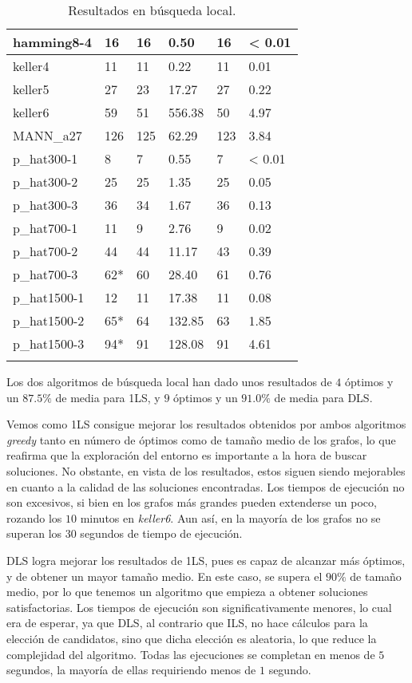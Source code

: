 \begin{small}
\begin{longtable}{l l l l l l}
    hamming8-4         & 16 & 16 & 0.50 & 16 & < 0.01   \\ \hline
    keller4            & 11 & 11 & 0.22 & 11 & 0.01  \\ \hline
    keller5            & 27 & 23 & 17.27 & 27 & 0.22   \\ \hline
    keller6            & 59 & 51 & 556.38 & 50 & 4.97   \\ \hline
    MANN\_a27          & 126 & 125 & 62.29 & 123 & 3.84   \\ \hline
    p\_hat300-1        & 8 & 7 & 0.55 & 7 & < 0.01   \\ \hline
    p\_hat300-2        & 25 & 25 & 1.35 & 25 & 0.05   \\ \hline
    p\_hat300-3        & 36 & 34 & 1.67 & 36 & 0.13  \\ \hline
    p\_hat700-1        & 11 & 9 & 2.76 & 9 & 0.02   \\ \hline
    p\_hat700-2        & 44 & 44 & 11.17 & 43 & 0.39   \\ \hline
    p\_hat700-3        & 62* & 60 & 28.40 & 61 & 0.76  \\ \hline
    p\_hat1500-1       & 12 & 11 & 17.38 & 11 & 0.08   \\ \hline
    p\_hat1500-2       & 65* & 64 & 132.85 & 63 & 1.85   \\ \hline
    p\_hat1500-3       & 94* & 91 & 128.08 & 91 & 4.61   \\ \hline
  \caption{Resultados en búsqueda local.}
\end{longtable}
\end{small}

Los dos algoritmos de búsqueda local han dado unos resultados de $4$ óptimos y
un $87.5\%$ de media para 1LS, y $9$ óptimos y un $91.0\%$ de media para DLS.

Vemos como 1LS consigue mejorar los resultados obtenidos por ambos algoritmos
\textit{greedy} tanto en número de óptimos como de tamaño medio de los grafos,
lo que reafirma que la exploración del entorno es importante a la hora de buscar
soluciones. No obstante, en vista de los resultados, estos siguen siendo mejorables
en cuanto a la calidad de las soluciones encontradas. Los tiempos de ejecución no
son excesivos, si bien en los grafos más grandes pueden extenderse un poco,
rozando los $10$ minutos en \textit{keller6}. Aun así, en la mayoría de los grafos
no se superan los $30$ segundos de tiempo de ejecución.

DLS logra mejorar los resultados de 1LS, pues es capaz de alcanzar más óptimos,
y de obtener un mayor tamaño medio. En este caso, se supera el $90\%$ de tamaño
medio, por lo que tenemos un algoritmo que empieza a obtener soluciones satisfactorias.
Los tiempos de ejecución son significativamente menores, lo cual era de esperar,
ya que DLS, al contrario que ILS, no hace cálculos para la elección de candidatos,
sino que dicha elección es aleatoria, lo que reduce la complejidad del algoritmo.
Todas las ejecuciones se completan en menos de $5$ segundos, la mayoría de ellas
requiriendo menos de $1$ segundo.

